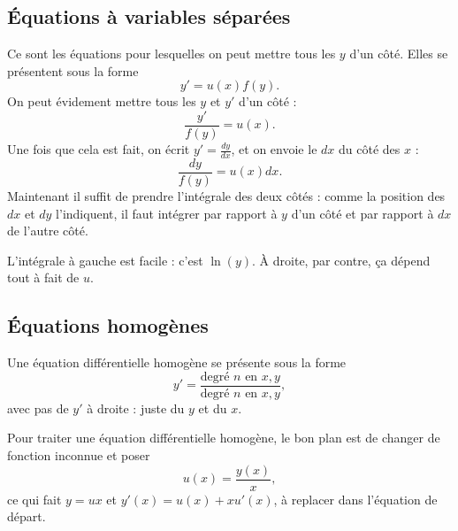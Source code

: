 					\subsection{Équations à variables séparées}

Ce sont les équations pour lesquelles on peut mettre tous les $y$ d'un côté. Elles se présentent sous la forme
\begin{equation}
	y'=u(x)f(y).
\end{equation}
On peut évidement mettre tous les $y$ et $y'$ d'un côté :
\begin{equation}
	\frac{ y' }{ f(y) }=u(x).
\end{equation}
Une fois que cela est fait, on écrit $y'=\frac{ dy }{ dx }$, et on envoie le $dx$ du côté des $x$ :
\begin{equation}
	\frac{ dy }{ f(y) }=u(x)dx.
\end{equation}
Maintenant il suffit de prendre l'intégrale des deux côtés : comme la position des $dx$ et $dy$ l'indiquent, il faut intégrer par rapport à $y$ d'un côté et par rapport à $dx$ de l'autre côté.

L'intégrale à gauche est facile : c'est $\ln(y)$. À droite, par contre, ça dépend tout à fait de $u$.

					\subsection{Équations homogènes}

Une équation différentielle homogène se présente sous la forme
\begin{equation}
	y'=\frac{ \text{degré $n$ en $x,y$} }{  \text{degré $n$ en $x,y$}  },
\end{equation}
avec pas de $y'$ à droite : juste du $y$ et du $x$.

Pour traiter une équation différentielle homogène, le bon plan est de changer de fonction inconnue et poser
\begin{equation}		\label{EqSubstHomouyp}
	u(x)=\frac{ y(x) }{ x },
\end{equation}
ce qui fait $y=ux$ et $y'(x)=u(x)+xu'(x)$, à replacer dans l'équation de départ.


